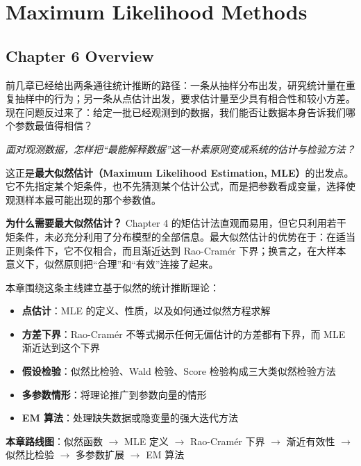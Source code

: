 
\chapter{Maximum Likelihood Methods}\label{chap:mle}

\section*{Chapter 6 Overview}

前几章已经给出两条通往统计推断的路径：一条从抽样分布出发，研究统计量在重复抽样中的行为；另一条从点估计出发，要求估计量至少具有相合性和较小方差。现在问题反过来了：给定一批已经观测到的数据，我们能否让数据本身告诉我们哪个参数最值得相信？

\begin{center}
\textit{面对观测数据，怎样把``最能解释数据''这一朴素原则变成系统的估计与检验方法？}
\end{center}

这正是\textbf{最大似然估计（Maximum Likelihood Estimation, MLE）}的出发点。它不先指定某个矩条件，也不先猜测某个估计公式，而是把参数看成变量，选择使观测样本最可能出现的那个参数值。

\textbf{为什么需要最大似然估计？} Chapter 4 的矩估计法直观而易用，但它只利用若干矩条件，未必充分利用了分布模型的全部信息。最大似然估计的优势在于：在适当正则条件下，它不仅相合，而且渐近达到 Rao-Cramér 下界；换言之，在大样本意义下，似然原则把``合理''和``有效''连接了起来。

本章围绕这条主线建立基于似然的统计推断理论：

\begin{itemize}
\item \textbf{点估计}：MLE 的定义、性质，以及如何通过似然方程求解
\item \textbf{方差下界}：Rao-Cramér 不等式揭示任何无偏估计的方差都有下界，而 MLE 渐近达到这个下界
\item \textbf{假设检验}：似然比检验、Wald 检验、Score 检验构成三大类似然检验方法
\item \textbf{多参数情形}：将理论推广到参数向量的情形
\item \textbf{EM 算法}：处理缺失数据或隐变量的强大迭代方法
\end{itemize}

\textbf{本章路线图}：似然函数 $\to$ MLE 定义 $\to$ Rao-Cramér 下界 $\to$ 渐近有效性 $\to$ 似然比检验 $\to$ 多参数扩展 $\to$ EM 算法

